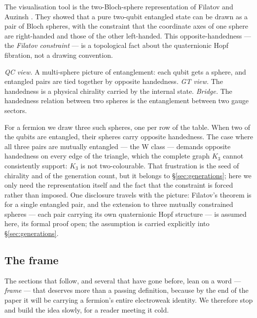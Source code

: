 The visualisation tool is the two-Bloch-sphere representation of Filatov and Auzinsh
\autocite{filatov2024towards}. They showed that a pure two-qubit entangled state can be drawn as a
pair of Bloch spheres, with the constraint that the coordinate axes of one sphere are
right-handed and those of the other left-handed. This opposite-handedness --- the \emph{Filatov
constraint} --- is a topological fact about the quaternionic Hopf fibration, not a drawing
convention.

\emph{QC view.} A multi-sphere picture of entanglement: each qubit gets a sphere, and entangled
pairs are tied together by opposite handedness. \emph{GT view.} The handedness is a physical
chirality carried by the internal state. \emph{Bridge.} The handedness relation between two spheres
is the entanglement between two gauge sectors.

For a fermion we draw three such spheres, one per row of the table. When two of the qubits are
entangled, their spheres carry opposite handedness. The case where all three pairs are
mutually entangled --- the W class --- demands opposite handedness on every edge of the triangle,
which the complete graph $K_3$ cannot consistently support: $K_3$ is not two-colourable. That
frustration is the seed of chirality and of the generation count, but it belongs to
\S\ref{sec:generations}; here we only need the representation itself and the fact that the
constraint is forced rather than imposed. One disclosure travels with the picture: Filatov's
theorem is for a single entangled pair, and the extension to three mutually constrained spheres ---
each pair carrying its own quaternionic Hopf structure --- is assumed here, its formal proof open;
the assumption is carried explicitly into \S\ref{sec:generations}.

\subsection{The frame}\label{sec:frame}

The sections that follow, and several that have gone before, lean on a word --- \emph{frame} ---
that deserves more than a passing definition, because by the end of the paper it will be carrying
a fermion's entire electroweak identity. We therefore stop and build the idea slowly, for a reader
meeting it cold.

